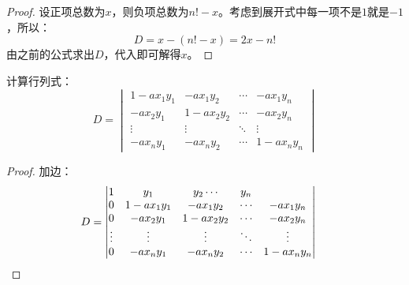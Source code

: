 \begin{proof}
	设正项总数为$x$，则负项总数为$n!-x$。考虑到展开式中每一项不是$1$就是$-1$，所以：
	\begin{equation*}
		D=x-(n!-x)=2x-n!
	\end{equation*}
	由之前的公式求出$D$，代入即可解得$x$。
\end{proof}
\begin{theorem}
	计算行列式：
	\begin{equation*}
		D=
		\begin{vmatrix}
			1-ax_1y_1 & -ax_1y_2 & \cdots & -ax_1y_n \\
			-ax_2y_1 & 1-ax_2y_2 & \cdots & -ax_2y_n \\
			\vdots & \vdots & \ddots & \vdots \\
			-ax_ny_1 & -ax_ny_2 & \cdots & 1-ax_ny_n
		\end{vmatrix}
	\end{equation*}
\end{theorem}
\begin{proof}
	加边：
	\begin{align*}
		D&=
		\begin{vmatrix}
			1 & y_1 & y_2 \cdots & y_n \\
			0 & 1-ax_1y_1 & -ax_1y_2 & \cdots & -ax_1y_n \\
			0 & -ax_2y_1 & 1-ax_2y_2 & \cdots & -ax_2y_n \\
			\vdots & \vdots & \vdots & \ddots & \vdots \\
			0 & -ax_ny_1 & -ax_ny_2 & \cdots & 1-ax_ny_n
		\end{vmatrix}\qedhere
	\end{align*}
\end{proof}